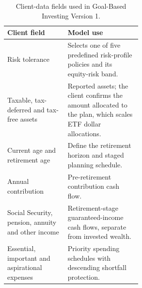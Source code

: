 \begin{table}[htbp]
\centering
\footnotesize
\caption{Client-data fields used in Goal-Based Investing Version 1.}
\label{tab:gbi-client-inputs}
\begin{tabular}{lp{0.55\linewidth}}
\toprule
Client field & Model use \\
\midrule
Risk tolerance & Selects one of five predefined risk-profile policies and its equity-risk band. \\
Taxable, tax-deferred and tax-free assets & Reported assets; the client confirms the amount allocated to the plan, which scales ETF dollar allocations. \\
Current age and retirement age & Define the retirement horizon and staged planning schedule. \\
Annual contribution & Pre-retirement contribution cash flow. \\
Social Security, pension, annuity and other income & Retirement-stage guaranteed-income cash flows, separate from invested wealth. \\
Essential, important and aspirational expenses & Priority spending schedules with descending shortfall protection. \\
\bottomrule
\end{tabular}
\end{table}
